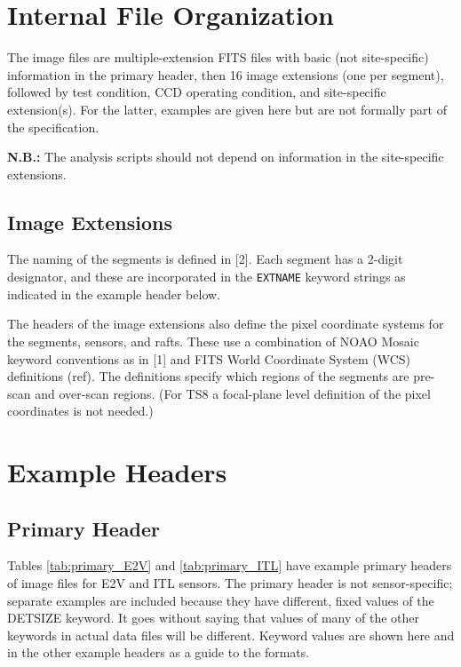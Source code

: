 \documentclass{article}[12pt]
\begin{document}
\section{Internal File Organization}

The image files are multiple-extension FITS files with basic (not site-specific) information in the primary header, then 16 image extensions (one per segment), followed by test condition, CCD operating condition, and site-specific extension(s).  For the latter, examples are given here but are not formally part of the specification.  

{\bf N.B.:} The analysis scripts should not depend on information in the site-specific extensions.

\subsection{Image Extensions}

The naming of the segments is defined in [2].  Each segment has a 2-digit designator, and these are incorporated in the {\tt EXTNAME} keyword strings as indicated in the example header below.

The headers of the image extensions also define the pixel coordinate systems for the segments, sensors, and rafts.  These use a combination of NOAO Mosaic keyword conventions as in [1] and FITS World Coordinate System (WCS) definitions (ref).  The definitions specify which regions of the segments are pre-scan and over-scan regions.  (For TS8 a focal-plane level definition of the pixel coordinates is not needed.)

\section{Example Headers}

\subsection{Primary Header}
Tables \ref{tab:primary_E2V} and \ref{tab:primary_ITL}  have example primary headers of image files for E2V and ITL sensors. The primary header is not sensor-specific; separate examples are included because they have different, fixed values of the DETSIZE keyword.  It goes without saying that values of many of the other keywords in actual data files will be different.  Keyword values are shown here and in the other example headers as a guide to the formats.
\end{document}
